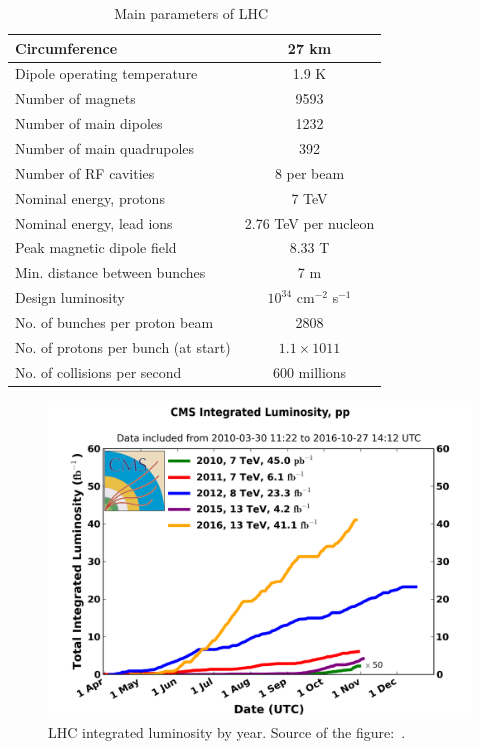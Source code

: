 \begin{table}[h]
  \begin{center}
  \caption{ Main parameters of LHC~\cite{ref_LHC_brochure}}
  \vspace{5 mm}
  \begin{tabular}{|l|c|}
     \hline
     Circumference & 27 km  \\ \hline
     Dipole operating temperature &  1.9 K \\ \hline
     Number of magnets &  9593 \\ \hline
     Number of main dipoles &  1232 \\ \hline
     Number of main quadrupoles &  392 \\ \hline
     Number of RF cavities &  8 per beam \\ \hline
     Nominal energy, protons &  7 TeV \\ \hline
     Nominal energy, lead ions &  2.76 TeV per nucleon \\ \hline
     Peak magnetic dipole field &  8.33 T \\ \hline
     Min. distance between bunches &  7 m \\ \hline
     Design luminosity &  $10^{34}$ cm$^{-2}$ s$^{-1}$ \\ \hline
     No. of bunches per proton beam &  2808 \\ \hline
     No. of protons per bunch (at start) &  $1.1\times 10{11}$ \\ \hline
     No. of collisions per second &  600 millions \\ \hline
  \end{tabular}
  \label{tab:LHCparameters}
  \end{center}
 \end{table}

\begin{figure}
  \centering
  \includegraphics[width=.80\linewidth]{../figs/Exp/int_lumi_cumulative_pp_2.png}
  \caption{LHC integrated luminosity by year. Source of the figure:~\cite{ref_fig_LHClumi}.}
  \label{fig:LHClumi}
\end{figure}

